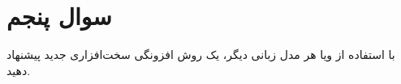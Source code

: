 \section{سوال پنجم}

با استفاده از  ویا هر مدل زبانی دیگر، یک روش افزونگی سخت‌افزاری جدید پیشنهاد دهید.




\begin{qsolve}
	
\end{qsolve}